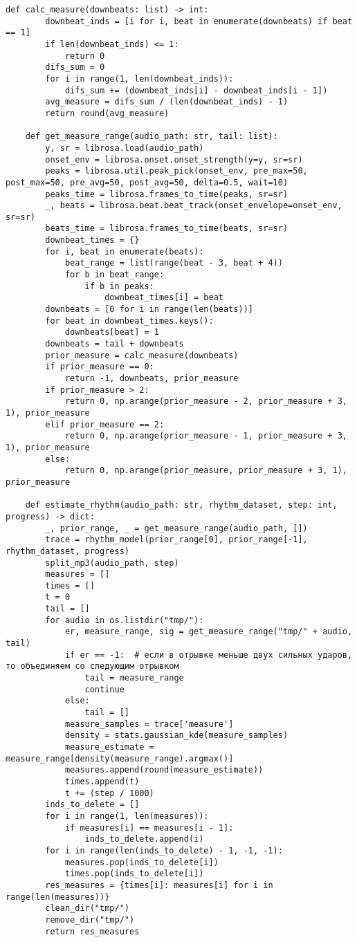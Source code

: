 \begin{lstlisting}[caption={модуль оценки темпа и ритма}]
	def calc_measure(downbeats: list) -> int:
		downbeat_inds = [i for i, beat in enumerate(downbeats) if beat == 1]
		if len(downbeat_inds) <= 1:
			return 0
		difs_sum = 0
		for i in range(1, len(downbeat_inds)):
			difs_sum += (downbeat_inds[i] - downbeat_inds[i - 1])
		avg_measure = difs_sum / (len(downbeat_inds) - 1)
		return round(avg_measure)
	
	def get_measure_range(audio_path: str, tail: list):
		y, sr = librosa.load(audio_path)
		onset_env = librosa.onset.onset_strength(y=y, sr=sr)
		peaks = librosa.util.peak_pick(onset_env, pre_max=50, post_max=50, pre_avg=50, post_avg=50, delta=0.5, wait=10)
		peaks_time = librosa.frames_to_time(peaks, sr=sr)
		_, beats = librosa.beat.beat_track(onset_envelope=onset_env, sr=sr)
		beats_time = librosa.frames_to_time(beats, sr=sr)
		downbeat_times = {}
		for i, beat in enumerate(beats):
			beat_range = list(range(beat - 3, beat + 4))
			for b in beat_range:
				if b in peaks:
					downbeat_times[i] = beat
		downbeats = [0 for i in range(len(beats))]
		for beat in downbeat_times.keys():
			downbeats[beat] = 1
		downbeats = tail + downbeats
		prior_measure = calc_measure(downbeats)
		if prior_measure == 0:
			return -1, downbeats, prior_measure
		if prior_measure > 2:
			return 0, np.arange(prior_measure - 2, prior_measure + 3, 1), prior_measure
		elif prior_measure == 2:
			return 0, np.arange(prior_measure - 1, prior_measure + 3, 1), prior_measure
		else:
			return 0, np.arange(prior_measure, prior_measure + 3, 1), prior_measure
	
	def estimate_rhythm(audio_path: str, rhythm_dataset, step: int, progress) -> dict:
		_, prior_range, _ = get_measure_range(audio_path, [])
		trace = rhythm_model(prior_range[0], prior_range[-1], rhythm_dataset, progress)
		split_mp3(audio_path, step)
		measures = []
		times = []
		t = 0
		tail = []
		for audio in os.listdir("tmp/"):
			er, measure_range, sig = get_measure_range("tmp/" + audio, tail)
			if er == -1:  # если в отрывке меньше двух сильных ударов, то объединяем со следующим отрывком
				tail = measure_range
				continue
			else:
				tail = []
			measure_samples = trace['measure']
			density = stats.gaussian_kde(measure_samples)
			measure_estimate = measure_range[density(measure_range).argmax()]
			measures.append(round(measure_estimate))
			times.append(t)
			t += (step / 1000)
		inds_to_delete = []
		for i in range(1, len(measures)):
			if measures[i] == measures[i - 1]:
				inds_to_delete.append(i)
		for i in range(len(inds_to_delete) - 1, -1, -1):
			measures.pop(inds_to_delete[i])
			times.pop(inds_to_delete[i])
		res_measures = {times[i]: measures[i] for i in range(len(measures))}
		clean_dir("tmp/")
		remove_dir("tmp/")
		return res_measures
\end{lstlisting}

